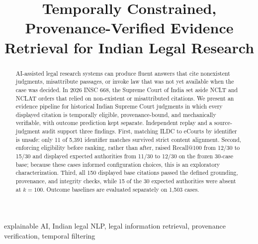 \documentclass[conference]{IEEEtran}
\begin{document}
\title{Temporally Constrained, Provenance-Verified Evidence Retrieval for Indian Legal Research}
\author{
}
\maketitle

\begin{abstract}
AI-assisted legal research systems can produce fluent answers that cite nonexistent judgments, misattribute passages, or invoke law that was not yet available when the case was decided. In 2026 INSC 668, the Supreme Court of India set aside NCLT and NCLAT orders that relied on non-existent or misattributed citations. We present an evidence pipeline for historical Indian Supreme Court judgments in which every displayed citation is temporally eligible, provenance-bound, and mechanically verifiable, with outcome prediction kept separate. Independent replay and a source-judgment audit support three findings. First, matching ILDC to eCourts by identifier is unsafe: only 11 of 5,391 identifier matches survived strict content alignment. Second, enforcing eligibility before ranking, rather than after, raised Recall@100 from 12/30 to 15/30 and displayed expected authorities from 11/30 to 12/30 on the frozen 30-case base; because these cases informed configuration choices, this is an exploratory characterization. Third, all 150 displayed base citations passed the defined grounding, provenance, and integrity checks, while 15 of the 30 expected authorities were absent at $k=100$. Outcome baselines are evaluated separately on 1,503 cases.
\end{abstract}

\begin{IEEEkeywords}
explainable AI, Indian legal NLP, legal information retrieval, provenance verification, temporal filtering
\end{IEEEkeywords}
\end{document}
